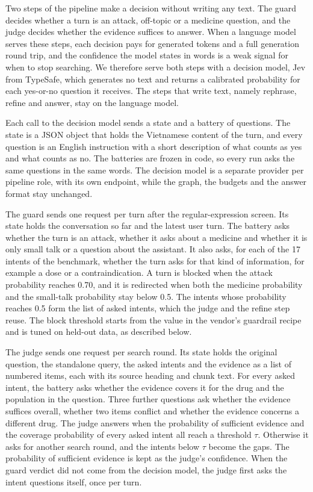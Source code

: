 Two steps of the pipeline make a decision without writing any text. The guard decides whether a turn is an attack, off-topic or a medicine question, and the judge decides whether the evidence suffices to answer. When a language model serves these steps, each decision pays for generated tokens and a full generation round trip, and the confidence the model states in words is a weak signal for when to stop searching. %
We therefore serve both steps with a decision model, Jev from TypeSafe, which generates no text and returns a calibrated probability for each yes-or-no question it receives. %
The steps that write text, namely rephrase, refine and answer, stay on the language model.

Each call to the decision model sends a state and a battery of questions. The state is a JSON object that holds the Vietnamese content of the turn, and every question is an English instruction with a short description of what counts as yes and what counts as no. The batteries are frozen in code, so every run asks the same questions in the same words. The decision model is a separate provider per pipeline role, with its own endpoint, while the graph, the budgets and the answer format stay unchanged.

The guard sends one request per turn after the regular-expression screen. Its state holds the conversation so far and the latest user turn. The battery asks whether the turn is an attack, whether it asks about a medicine and whether it is only small talk or a question about the assistant. It also asks, for each of the 17 intents of the benchmark, whether the turn asks for that kind of information, for example a dose or a contraindication. A turn is blocked when the attack probability reaches 0.70, and it is redirected when both the medicine probability and the small-talk probability stay below 0.5. The intents whose probability reaches 0.5 form the list of asked intents, which the judge and the refine step reuse. The block threshold starts from the value in the vendor's guardrail recipe and is tuned on held-out data, as described below.

The judge sends one request per search round. Its state holds the original question, the standalone query, the asked intents and the evidence as a list of numbered items, each with its source heading and chunk text. For every asked intent, the battery asks whether the evidence covers it for the drug and the population in the question. Three further questions ask whether the evidence suffices overall, whether two items conflict and whether the evidence concerns a different drug. The judge answers when the probability of sufficient evidence and the coverage probability of every asked intent all reach a threshold $\tau$. Otherwise it asks for another search round, and the intents below $\tau$ become the gaps. The probability of sufficient evidence is kept as the judge's confidence. When the guard verdict did not come from the decision model, the judge first asks the intent questions itself, once per turn.

